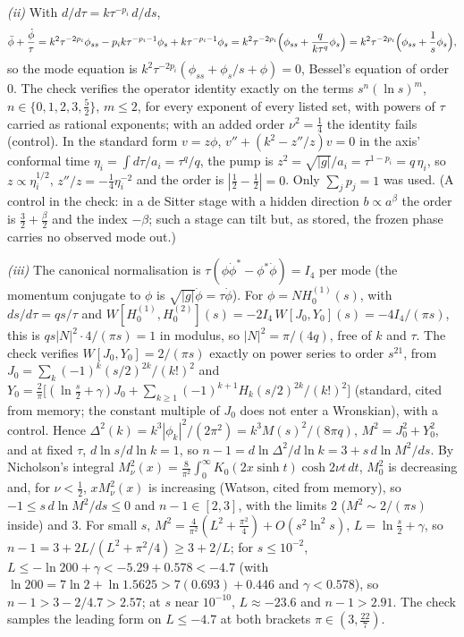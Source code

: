 \emph{(ii)} With $d/d\tau = k\tau^{-p_{i}}\,d/ds$,
\[
\ddot\phi + \frac{\dot\phi}{\tau} = k^{2}\tau^{-2p_{i}}\phi_{ss} - p_{i}k\tau^{-p_{i}-1}\phi_{s} + k\tau^{-p_{i}-1}\phi_{s} = k^{2}\tau^{-2p_{i}}\Bigl(\phi_{ss} + \frac{q}{k\tau^{q}}\phi_{s}\Bigr) = k^{2}\tau^{-2p_{i}}\Bigl(\phi_{ss} + \frac{1}{s}\phi_{s}\Bigr),
\]
so the mode equation is $k^{2}\tau^{-2p_{i}}(\phi_{ss} + \phi_{s}/s + \phi) = 0$, Bessel's equation of order $0$. The check verifies the operator identity exactly on the terms $s^{n}(\ln s)^{m}$, $n \in \{0, 1, 2, 3, \tfrac52\}$, $m \le 2$, for every exponent of every listed set, with powers of $\tau$ carried as rational exponents; with an added order $\nu^{2} = \tfrac14$ the identity fails (control). In the standard form $v = z\phi$, $v'' + (k^{2} - z''/z)v = 0$ in the axis' conformal time $\eta_{i} = \int d\tau/a_{i} = \tau^{q}/q$, the pump is $z^{2} = \sqrt{|g|}/a_{i} = \tau^{1 - p_{i}} = q\,\eta_{i}$, so $z \propto \eta_{i}^{1/2}$, $z''/z = -\tfrac14\eta_{i}^{-2}$ and the order is $|\tfrac12 - \tfrac12| = 0$. Only $\sum_{j}p_{j} = 1$ was used. (A control in the check: in a de Sitter stage with a hidden direction $b \propto a^{\beta}$ the order is $\tfrac32 + \tfrac{\beta}{2}$ and the index $-\beta$; such a stage can tilt but, as stored, the frozen phase carries no observed mode out.)

\emph{(iii)} The canonical normalisation is $\tau(\phi\dot\phi^{*} - \phi^{*}\dot\phi) = I_{4}$ per mode (the momentum conjugate to $\phi$ is $\sqrt{|g|}\dot\phi = \tau\dot\phi$). For $\phi = NH_{0}^{(1)}(s)$, with $ds/d\tau = qs/\tau$ and $W[H_{0}^{(1)}, H_{0}^{(2)}](s) = -2I_{4}\,W[J_{0}, Y_{0}](s) = -4I_{4}/(\pi s)$, this is $qs|N|^{2}\cdot 4/(\pi s) = 1$ in modulus, so $|N|^{2} = \pi/(4q)$, free of $k$ and $\tau$. The check verifies $W[J_{0}, Y_{0}] = 2/(\pi s)$ exactly on power series to order $s^{21}$, from $J_{0} = \sum_{k}(-1)^{k}(s/2)^{2k}/(k!)^{2}$ and $Y_{0} = \tfrac{2}{\pi}\bigl[(\ln\tfrac{s}{2} + \gamma)J_{0} + \sum_{k \ge 1}(-1)^{k+1}H_{k}(s/2)^{2k}/(k!)^{2}\bigr]$ (standard, cited from memory; the constant multiple of $J_{0}$ does not enter a Wronskian), with a control. Hence $\Delta^{2}(k) = k^{3}|\phi_{k}|^{2}/(2\pi^{2}) = k^{3}M(s)^{2}/(8\pi q)$, $M^{2} = J_{0}^{2} + Y_{0}^{2}$, and at fixed $\tau$, $d\ln s/d\ln k = 1$, so $n - 1 = d\ln\Delta^{2}/d\ln k = 3 + s\,d\ln M^{2}/ds$. By Nicholson's integral $M_{\nu}^{2}(x) = \tfrac{8}{\pi^{2}}\int_{0}^{\infty}K_{0}(2x\sinh t)\cosh 2\nu t\,dt$, $M_{0}^{2}$ is decreasing and, for $\nu < \tfrac12$, $xM_{\nu}^{2}(x)$ is increasing (Watson, cited from memory), so $-1 \le s\,d\ln M^{2}/ds \le 0$ and $n - 1 \in [2, 3]$, with the limits $2$ ($M^{2} \sim 2/(\pi s)$ inside) and $3$. For small $s$, $M^{2} = \tfrac{4}{\pi^{2}}(L^{2} + \tfrac{\pi^{2}}{4}) + O(s^{2}\ln^{2}s)$, $L = \ln\tfrac{s}{2} + \gamma$, so $n - 1 = 3 + 2L/(L^{2} + \pi^{2}/4) \ge 3 + 2/L$; for $s \le 10^{-2}$, $L \le -\ln 200 + \gamma < -5.29 + 0.578 < -4.7$ (with $\ln 200 = 7\ln 2 + \ln 1.5625 > 7(0.693) + 0.446$ and $\gamma < 0.578$), so $n - 1 > 3 - 2/4.7 > 2.57$; at $s$ near $10^{-10}$, $L \approx -23.6$ and $n - 1 > 2.91$. The check samples the leading form on $L \le -4.7$ at both brackets $\pi \in (3, \tfrac{22}{7})$.

